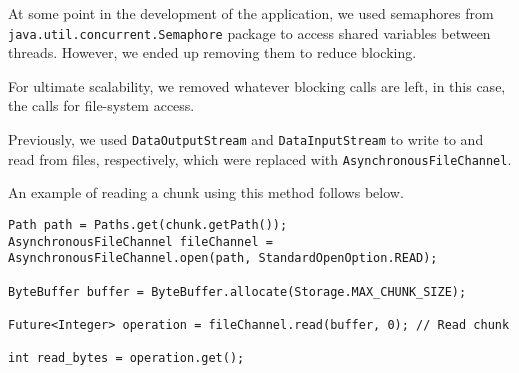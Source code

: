 \documentclass[11pt]{report}
\begin{document}
At some point in the development of the application, we used semaphores from \newline \texttt{java.util.concurrent.Semaphore} package to access shared variables between threads. However, we ended up removing them to reduce blocking. 

For ultimate scalability, we removed whatever blocking calls are left, in this case, the calls for file-system access.

Previously, we used \texttt{DataOutputStream} and \texttt{DataInputStream} to write to and read from files, respectively, which were replaced with \texttt{AsynchronousFileChannel}.

An example of reading a chunk using this method follows below.

\begin{verbatim}
Path path = Paths.get(chunk.getPath());
AsynchronousFileChannel fileChannel = AsynchronousFileChannel.open(path, StandardOpenOption.READ);

ByteBuffer buffer = ByteBuffer.allocate(Storage.MAX_CHUNK_SIZE);

Future<Integer> operation = fileChannel.read(buffer, 0); // Read chunk

int read_bytes = operation.get();
\end{verbatim}
\end{document}
